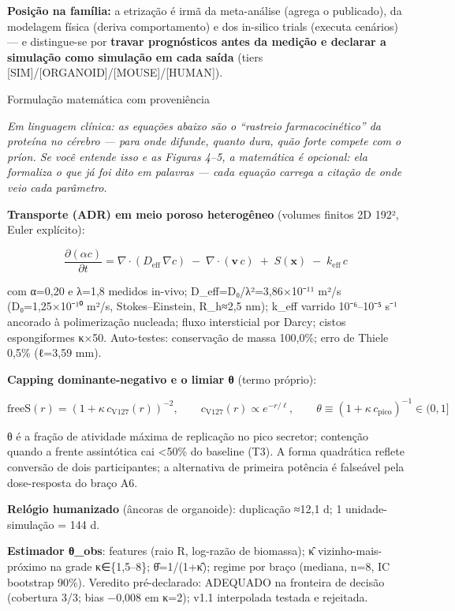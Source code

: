 \documentclass[12pt,a4paper,oneside]{report}
\begin{document}
\textbf{Posição na família:} a etrização é irmã da meta-análise (agrega
o publicado), da modelagem física (deriva comportamento) e dos in-silico
trials (executa cenários) --- e distingue-se por \textbf{travar
prognósticos antes da medição e declarar a simulação como simulação em
cada saída} (tiers {[}SIM{]}/{[}ORGANOID{]}/{[}MOUSE{]}/{[}HUMAN{]}).

Formulação matemática com proveniência

\emph{Em linguagem clínica: as equações abaixo são o ``rastreio
farmacocinético'' da proteína no cérebro --- para onde difunde, quanto
dura, quão forte compete com o príon. Se você entende isso e as Figuras
4--5, a matemática é opcional: ela formaliza o que já foi dito em
palavras --- cada equação carrega a citação de onde veio cada
parâmetro.}

\textbf{Transporte (ADR) em meio poroso heterogêneo} (volumes finitos 2D
192², Euler explícito):

\[\frac{\partial(\alpha c)}{\partial t} = \nabla\!\cdot\!(D_{\mathrm{eff}}\,\nabla c) \;-\; \nabla\!\cdot\!(\mathbf{v}\,c) \;+\; S(\mathbf{x}) \;-\; k_{\mathrm{eff}}\,c\]

com α=0,20 e λ=1,8 medidos in-vivo; D\_eff=D₀/λ²=3,86×10⁻¹¹ m²/s
(D₀=1,25×10⁻¹⁰ m²/s, Stokes--Einstein, R\_h≈2,5 nm); k\_eff varrido
10⁻⁶--10⁻⁵ s⁻¹ ancorado à polimerização nucleada; fluxo intersticial por
Darcy; cistos espongiformes κ×50. Auto-testes: conservação de massa
100,0\%; erro de Thiele 0,5\% (ℓ=3,59 mm).

\textbf{Capping dominante-negativo e o limiar θ} (termo próprio):

\[\mathrm{freeS}(r) = \left(1 + \kappa\, c_{\mathrm{V127}}(r)\right)^{-2}, \qquad c_{\mathrm{V127}}(r) \propto e^{-r/\ell}, \qquad \theta \equiv \left(1 + \kappa\, c_{\mathrm{pico}}\right)^{-1} \in (0,1]\]

θ é a fração de atividade máxima de replicação no pico secretor;
contenção quando a frente assintótica cai \textless50\% do baseline
(T3). A forma quadrática reflete conversão de dois participantes; a
alternativa de primeira potência é falseável pela dose-resposta do braço
A6.

\textbf{Relógio humanizado} (âncoras de organoide): duplicação ≈12,1 d;
1 unidade-simulação = 144 d.

\textbf{Estimador θ\_obs}: features (raio R, log-razão de biomassa); κ̂
vizinho-mais-próximo na grade κ∈\{1,5--8\}; θ̂=1/(1+κ̂); regime por braço
(mediana, n=8, IC bootstrap 90\%). Veredito pré-declarado: ADEQUADO na
fronteira de decisão (cobertura 3/3; bias −0,008 em κ=2); v1.1
interpolada testada e rejeitada.
\end{document}
